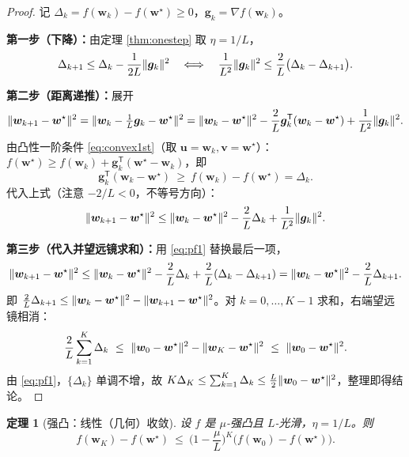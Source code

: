 \documentclass[UTF8,a4paper,11pt]{ctexart}
\theoremstyle{definition}
\theoremstyle{plain}
\newtheorem{theorem}[definition]{定理}
\theoremstyle{remark}
\DeclarePairedDelimiter{\norm}{\lVert}{\rVert}
\newcommand{\T}{^{\mathsf{T}}}
\begin{document}
\begin{proof}
记 $\Delta_k=f(\bm{w}_k)-f(\bm{w}^\star)\ge0$，$\bm{g}_k=\nabla f(\bm{w}_k)$。

\textbf{第一步（下降）：}由定理 \ref{thm:onestep} 取 $\eta=1/L$，
\begin{equation}\label{eq:pf1}
  \Delta_{k+1}\le\Delta_k-\frac{1}{2L}\norm{\bm{g}_k}^2
  \quad\Longleftrightarrow\quad
  \frac{1}{L^2}\norm{\bm{g}_k}^2\le\frac{2}{L}\big(\Delta_k-\Delta_{k+1}\big).
\end{equation}

\textbf{第二步（距离递推）：}展开
\[
  \norm{\bm{w}_{k+1}-\bm{w}^\star}^2=\norm{\bm{w}_k-\tfrac1L\bm{g}_k-\bm{w}^\star}^2
  =\norm{\bm{w}_k-\bm{w}^\star}^2-\frac{2}{L}\bm{g}_k\T(\bm{w}_k-\bm{w}^\star)+\frac{1}{L^2}\norm{\bm{g}_k}^2 .
\]
由凸性一阶条件 \eqref{eq:convex1st}（取 $\bm{u}=\bm{w}_k,\bm{v}=\bm{w}^\star$）：$f(\bm{w}^\star)\ge f(\bm{w}_k)+\bm{g}_k\T(\bm{w}^\star-\bm{w}_k)$，即
\[
  \bm{g}_k\T(\bm{w}_k-\bm{w}^\star)\ \ge\ f(\bm{w}_k)-f(\bm{w}^\star)=\Delta_k .
\]
代入上式（注意 $-2/L<0$，不等号方向）：
\[
  \norm{\bm{w}_{k+1}-\bm{w}^\star}^2\le\norm{\bm{w}_k-\bm{w}^\star}^2-\frac{2}{L}\Delta_k+\frac{1}{L^2}\norm{\bm{g}_k}^2 .
\]

\textbf{第三步（代入并望远镜求和）：}用 \eqref{eq:pf1} 替换最后一项，
\[
  \norm{\bm{w}_{k+1}-\bm{w}^\star}^2\le\norm{\bm{w}_k-\bm{w}^\star}^2-\frac{2}{L}\Delta_k+\frac{2}{L}(\Delta_k-\Delta_{k+1})
  =\norm{\bm{w}_k-\bm{w}^\star}^2-\frac{2}{L}\Delta_{k+1}.
\]
即 $\frac{2}{L}\Delta_{k+1}\le\norm{\bm{w}_k-\bm{w}^\star}^2-\norm{\bm{w}_{k+1}-\bm{w}^\star}^2$。对 $k=0,\dots,K-1$ 求和，右端望远镜相消：
\[
  \frac{2}{L}\sum_{k=1}^{K}\Delta_k\ \le\ \norm{\bm{w}_0-\bm{w}^\star}^2-\norm{\bm{w}_K-\bm{w}^\star}^2\ \le\ \norm{\bm{w}_0-\bm{w}^\star}^2 .
\]
由 \eqref{eq:pf1}，$\{\Delta_k\}$ 单调不增，故 $K\Delta_K\le\sum_{k=1}^K\Delta_k\le\frac{L}{2}\norm{\bm{w}_0-\bm{w}^\star}^2$，整理即得结论。
\end{proof}

\begin{theorem}[强凸：线性（几何）收敛]\label{thm:gd-sc}
设 $f$ 是 $\mu$-强凸且 $L$-光滑，$\eta=1/L$。则
\[
  f(\bm{w}_K)-f(\bm{w}^\star)\ \le\ \Big(1-\frac{\mu}{L}\Big)^{K}\big(f(\bm{w}_0)-f(\bm{w}^\star)\big).
\]
\end{theorem}
\end{document}
